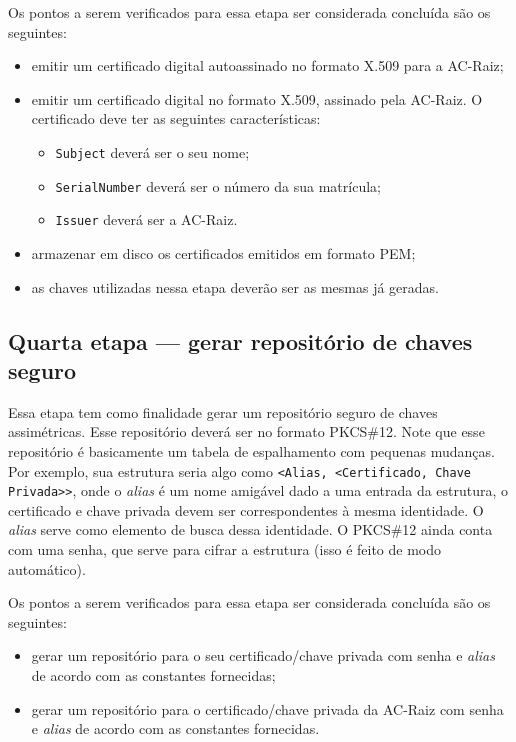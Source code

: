 \documentclass{article}
\begin{document}
Os pontos a serem verificados para essa etapa ser considerada concluída são os
seguintes:

\begin{itemize}
  \item emitir um certificado digital autoassinado no formato X.509 para a
      AC-Raiz;
  \item emitir um certificado digital no formato X.509, assinado pela AC-Raiz.
      O certificado deve ter as seguintes características:
  \begin{itemize}
    \item \texttt{Subject} deverá ser o seu nome;
    \item \texttt{SerialNumber} deverá ser o número da sua matrícula;
    \item \texttt{Issuer} deverá ser a AC-Raiz.
  \end{itemize}
  \item armazenar em disco os certificados emitidos em formato PEM;
  \item as chaves utilizadas nessa etapa deverão ser as mesmas já geradas.
\end{itemize}

\subsection{Quarta etapa ---
    gerar repositório de chaves seguro}\label{subsec:step4}

Essa etapa tem como finalidade gerar um repositório seguro de chaves
assimétricas. Esse repositório deverá ser no formato PKCS\#12. Note que esse
repositório é basicamente um tabela de espalhamento com pequenas mudanças. Por
exemplo, sua estrutura seria algo como \texttt{<Alias, <Certificado, Chave
Privada>>}, onde o \textit{alias} é um nome amigável dado a uma entrada da
estrutura, o certificado e chave privada devem ser correspondentes à mesma
identidade. O \textit{alias} serve como elemento de busca dessa identidade. O
PKCS\#12 ainda conta com uma senha, que serve para cifrar a estrutura (isso é
feito de modo automático).

Os pontos a serem verificados para essa etapa ser considerada concluída são os
seguintes:

\begin{itemize}
  \item gerar um repositório para o seu certificado/chave privada com senha e
      \textit{alias} de acordo com as constantes fornecidas;
  \item gerar um repositório para o certificado/chave privada da AC-Raiz com
      senha e \textit{alias} de acordo com as constantes fornecidas.
\end{itemize}
\end{document}
